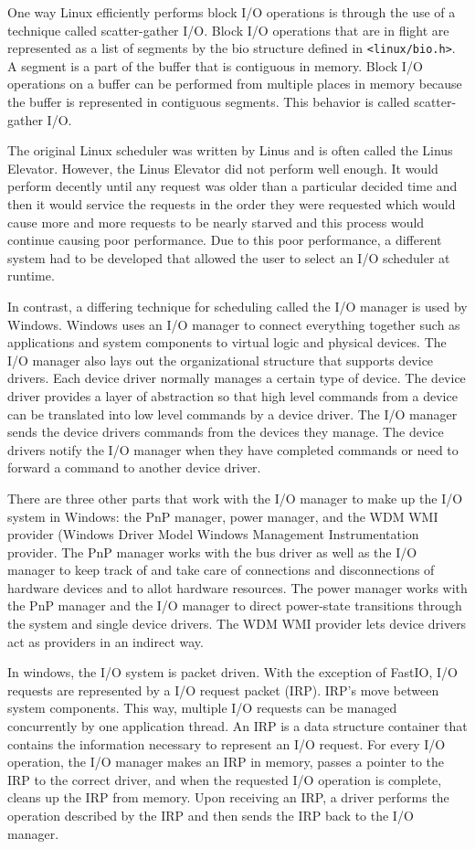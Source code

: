 \documentclass[letterpaper,10pt,draftclsnofoot,onecolumn,]{IEEEtran}
\begin{document}
One way Linux efficiently performs block I/O operations is through the use of a technique called scatter-gather I/O. Block I/O operations that are in flight are represented as a list of segments by the bio structure defined in \verb|<linux/bio.h>|. A segment is a part of the buffer that is contiguous in memory. Block I/O operations on a buffer can be performed from multiple places in memory because the buffer is represented in contiguous segments. This behavior is called scatter-gather I/O.

The original Linux scheduler was written by Linus and is often called the Linus Elevator. However, the Linus Elevator did not perform well enough. It would perform decently until any request was older than a particular decided time and then it would service the requests in the order they were requested which would cause more and more requests to be nearly starved and this process would continue causing poor performance. Due to this poor performance, a different system had to be developed that allowed the user to select an I/O scheduler at runtime.

In contrast, a differing technique for scheduling called the I/O manager is used by Windows. Windows uses an I/O manager to connect everything together such as applications and system components to virtual logic and physical devices. The I/O manager also lays out the organizational structure that supports device drivers. Each device driver normally manages a certain type of device. The device driver provides a layer of abstraction so that high level commands from a device can be translated into low level commands by a device driver. The I/O manager sends the device drivers commands from the devices they manage. The device drivers notify the I/O manager when they have completed commands or need to forward a command to another device driver.

There are three other parts that work with the I/O manager to make up the I/O system in Windows: the PnP manager, power manager, and the WDM WMI provider (Windows Driver Model Windows Management Instrumentation provider. The PnP manager works with the bus driver as well as the I/O manager to keep track of and take care of connections and disconnections of hardware devices and to allot hardware resources. The power manager works with the PnP manager and the I/O manager to direct power-state transitions through the system and single device drivers. The WDM WMI provider lets device drivers act as providers in an indirect way.

In windows, the I/O system is packet driven. With the exception of FastIO, I/O requests are represented by a I/O request packet (IRP). IRP's move between system components. This way, multiple I/O requests can be managed concurrently by one application thread. An IRP is a data structure container that contains the information necessary to represent an I/O request. For every I/O operation, the I/O manager makes an IRP in memory, passes a pointer to the IRP to the correct driver, and when the requested I/O operation is complete, cleans up the IRP from memory. Upon receiving an IRP, a driver performs the operation described by the IRP and then  sends the IRP back to the I/O manager.
\end{document}
